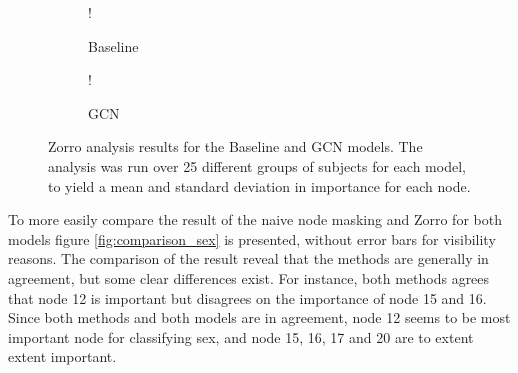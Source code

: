 \begin{figure}[H]
    \centering
        \begin{subfigure}{.5\textwidth}
            \centering
            \begin{center}
                \resizebox {1.0\linewidth} {!} {
                    
                }
            \end{center}
            \caption{Baseline}
            \label{fig:zorro_sex_baseline}
        \end{subfigure}%
        \begin{subfigure}{.5\textwidth}
            \centering
            \begin{center}
                \resizebox {1.0\linewidth} {!} {
                    
                }
            \end{center}
            \caption{GCN}
            \label{fig:zorro_sex_gcn}
        \end{subfigure}
    \caption{Zorro analysis results for the Baseline and GCN models. The analysis was run over 25 different groups of subjects for each model, to yield a mean and standard deviation in importance for each node.}
    \label{fig:zorro_sex}
\end{figure}

To more easily compare the result of the naive node masking and Zorro for both models figure \ref{fig:comparison_sex} is presented, without error bars for visibility reasons. The comparison of the result reveal that the methods are generally in agreement, but some clear differences exist. For instance, both methods agrees that node 12 is important but disagrees on the importance of node 15 and 16. Since both methods and both models are in agreement, node 12 seems to be most important node for classifying sex, and node 15, 16, 17 and 20 are to extent extent important.

